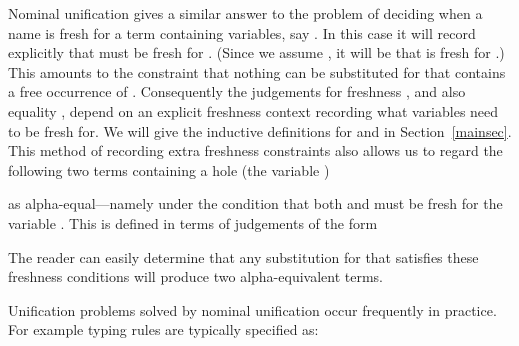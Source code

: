 \begin{isabellebody}
\begin{isamarkuptext}
  Nominal unification gives a similar answer to the problem of deciding when a name is fresh
  for a term containing variables, say . In this case 
  it will record explicitly that  must be fresh for . (Since we assume 
  , it will be that  is fresh for .) 
  This amounts to
  the constraint that  nothing can be substituted for  that contains a free occurrence
  of . Consequently the judgements for freshness , and also equality , 
  depend on an explicit freshness context recording what variables need to be fresh for. 
  We will give the inductive definitions for  and  in Section~\ref{mainsec}.
  This method of recording extra freshness constraints also allows us to regard
  the following two terms containing a hole (the variable )

  \begin{center}
  \end{center}
  
  \noindent
  as alpha-equal---namely under the condition that both  and  must
  be fresh for the variable . This is defined in terms of judgements of the form

  \begin{center}
  \end{center}

  \noindent
  The reader can easily determine that any substitution 
  for  that satisfies these freshness conditions will produce two
  alpha-equivalent terms. 

  Unification problems solved by nominal unification occur frequently in practice. 
  For example typing rules are typically specified as:


\end{isamarkuptext}
\end{isabellebody}
